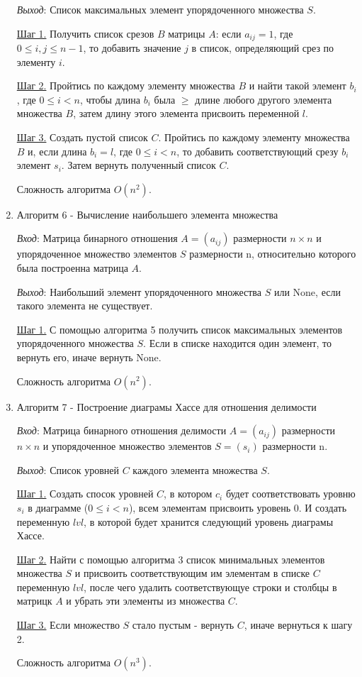 \documentclass[spec, och, labwork]{shiza}
\begin{document}
\begin{enumerate}
    \textit{Выход}: Список максимальных элемент упорядоченного множества $S$.

    \underline{Шаг 1.} Получить список срезов $B$ матрицы $A$: если $a_{ij} = 1$, где $0 \leq i, j \leq n - 1$, 
    то добавить значение $j$ в список, определяющий срез по элементу $i$. 

    \underline{Шаг 2.} Пройтись по каждому элементу множества $B$ и найти такой элемент $b_i$, где $0 \leq i < n$, чтобы 
    длина $b_i$ была $\geq$ длине любого другого элемента множества $B$, затем длину этого элемента присвоить переменной $l$.

    \underline{Шаг 3.} Создать пустой список $C$. Пройтись по каждому элементу множества $B$ и, если длина $b_i = l$, где $0 \leq i < n$,
    то добавить соответствующий срезу $b_i$ элемент $s_i$. Затем вернуть полученный список $C$.

    Сложность алгоритма $O(n^2)$.

    \item Алгоритм 6 - Вычисление наибольшего элемента множества
    
    \textit{Вход}: Матрица бинарного отношения $A = (a_{ij})$ размерности $n \times n$ и упорядоченное множество элементов $S$ размерности n, относительно которого
    была построенна матрица $A$.

    \textit{Выход}: Наибольший элемент упорядоченного множества $S$ или None, если такого элемента не существует.

    \underline{Шаг 1.} С помощью алгоритма 5 получить список максимальных элементов упорядоченного множества $S$. Если в списке
    находится один элемент, то вернуть его, иначе вернуть None.

    Сложность алгоритма $O(n^2)$.

    \item Алгоритм 7 - Построение диаграмы Хассе для отношения делимости
    
    \textit{Вход}: Матрица бинарного отношения делимости $A = (a_{ij})$ размерности $n \times n$ и упорядоченное множество элементов $S = (s_{i})$ размерности n.

    \textit{Выход}: Список уровней $C$ каждого элемента множества $S$.

    \underline{Шаг 1.} Создать спосок уровней $C$, в котором $c_i$ будет соответствовать уровню $s_i$ в диаграмме ($0 \leq i < n$), всем элементам присвоить уровень 0.
    И создать переменную $lvl$, в которой будет хранится следующий уровень диаграмы Хассе.

    \underline{Шаг 2.} Найти с помощью алгоритма 3 список минимальных элементов множества $S$ и присвоить соответствующим им
    элементам в списке $C$ переменную $lvl$, после чего удалить соответствующуе строки и столбцы в матрицк $A$ и убрать эти
    элементы из множества $C$.

    \underline{Шаг 3.} Если множество $S$ стало пустым - вернуть $C$, иначе вернуться к шагу 2.

    Сложность алгоритма $O(n^3)$.
\end{enumerate}
\end{document}

